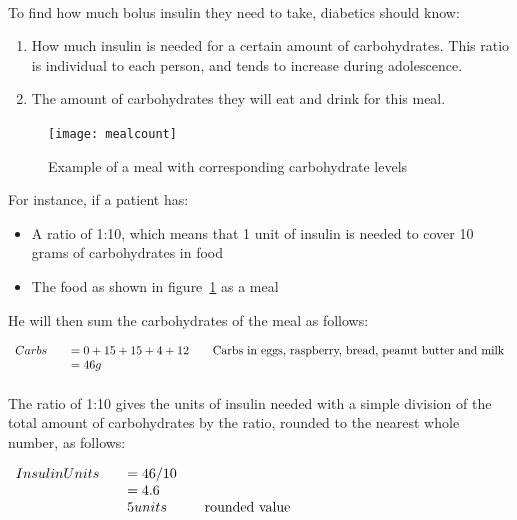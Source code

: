 \paragraph{}To find how much bolus insulin they need to take, diabetics should know:
\begin{enumerate}
\item How much insulin is needed for a certain amount of carbohydrates. This ratio is individual to each person, and tends to increase during adolescence.
\item The amount of carbohydrates they will eat and drink for this meal.
\end{enumerate}

\begin{figure}[h]
  \centering
  \caption{Example of a meal with corresponding carbohydrate levels~\cite{refhowtocarbPic}}
  \texttt{[image: mealcount]}
  \label{fig:mealcount}
\end{figure}

For instance, if a patient has:
\begin{itemize}
\item A ratio of 1:10, which means that 1 unit of insulin is needed to cover 10 grams of carbohydrates in food
\item The food as shown in figure~\ref{fig:mealcount} as a meal
\end{itemize}



He will then sum the carbohydrates of the meal as follows:

$\begin{array}{l l l}
    Carbs & \quad  = 0 + 15 + 15 + 4 + 12   & \quad \textrm{Carbs in eggs, raspberry, bread, peanut butter and milk}\\
         & \quad = 46 g   
  \end{array}$
  
\paragraph{}
The ratio of 1:10 gives the units of insulin needed with a simple division of the total amount of carbohydrates by the ratio, rounded to the nearest whole number, as follows:

$\begin{array}{l l l}
    InsulinUnits & \quad  = 46/10 \\
         & \quad = 4.6  \\
         & \quad 5 units & \quad \textrm{rounded value}
  \end{array}$
